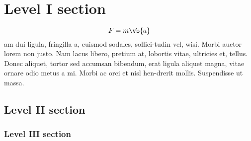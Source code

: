 \documentclass[12 pt]{article}
\begin{document}
\tableofcontents
\section{Level I section}

\lipsum[1]
\[
    F = m\vb{a}
\]
am dui ligula, fringilla a, euismod sodales, sollici-tudin vel, wisi.
Morbi auctor lorem non justo.
Nam  lacus libero, pretium at, lobortis vitae, ultricies et, tellus.
Donec aliquet, tortor sed accumsan bibendum, erat ligula aliquet magna, vitae ornare odio metus a mi.
Morbi ac orci et nisl hen-drerit mollis.
Suspendisse ut massa.

\subsection{Level II section}
\lipsum[3]

\subsubsection{Level III section}
\lipsum[4]
\end{document}
